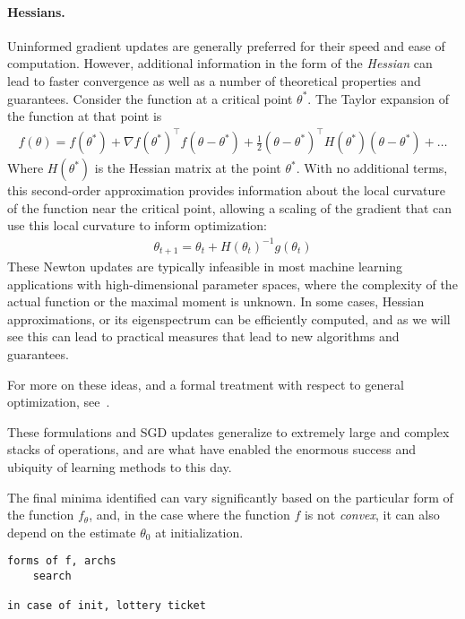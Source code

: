 \paragraph{Hessians.}
Uninformed gradient updates
are generally preferred
for their speed and ease of computation.
However, additional information in the form of the \textit{Hessian}
can lead to faster convergence
as well as a number of theoretical properties and guarantees.
Consider the function at a critical point $\theta^*$.
The Taylor expansion of the function at that point is
\begin{align}
f(\theta) = f(\theta^*) + \nabla f(\theta^*)^\top f(\theta - \theta^*) + \frac{1}{2}(\theta - \theta^*)^\top H(\theta^*)(\theta - \theta^*) + \ldots
\end{align}
Where $H(\theta^*)$ is the Hessian matrix at the point $\theta^*$. 
With no additional terms, this second-order approximation provides information
about the local curvature of the function near the critical point,
allowing a scaling of the gradient that can use this local 
curvature to inform optimization:
\begin{align}\label{eq:newtonstep}
	\theta_{t+1} = \theta_t + H(\theta_t)^{-1} g(\theta_t)
\end{align}
These Newton updates are typically infeasible in most
machine learning applications with high-dimensional
parameter spaces, where the complexity of
the actual function or the maximal moment is unknown.
In some cases, Hessian approximations,
or its eigenspectrum can be efficiently computed,
and as we will see this can lead to 
practical measures that lead to new
algorithms and guarantees.

For more on these ideas, 
and a formal treatment with respect to 
general optimization, see~\cite{wright1999numerical}.

These formulations and SGD updates generalize
to extremely large and complex stacks
of operations, and are what have enabled
the enormous success and ubiquity of learning
methods to this day.



The final minima identified can 
vary significantly based on the particular form 
of the function $f_\theta$, and,
in the case where the function $f$ is
not \textit{convex},
it can also depend on
the estimate $\theta_0$ at initialization.


\begin{verbatim}
forms of f, archs
	search

in case of init, lottery ticket
\end{verbatim}


